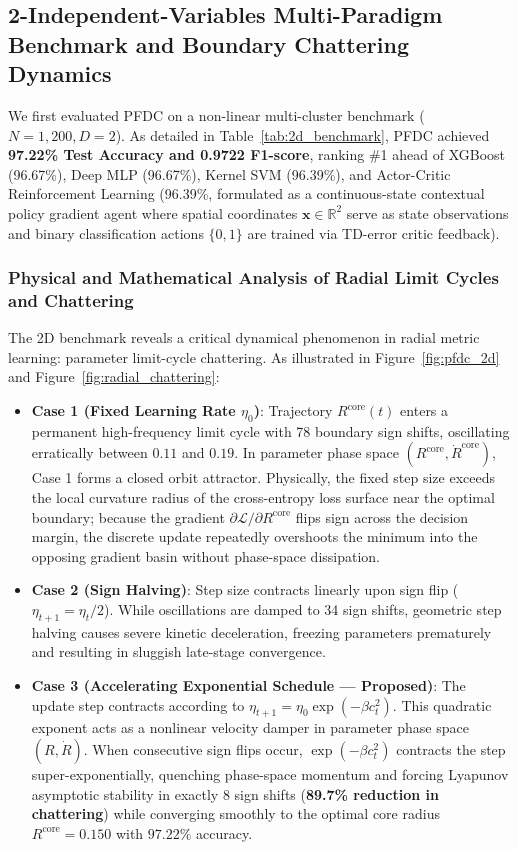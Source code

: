 \documentclass[preprint,review,12pt]{elsarticle}
\begin{document}
\subsection{2-Independent-Variables Multi-Paradigm Benchmark and Boundary Chattering Dynamics}
\label{sec:2d_benchmark}
We first evaluated PFDC on a non-linear multi-cluster benchmark ($N=1,200, D=2$). As detailed in Table~\ref{tab:2d_benchmark}, PFDC achieved \textbf{97.22\% Test Accuracy and 0.9722 F1-score}, ranking \#1 ahead of XGBoost (96.67\%), Deep MLP (96.67\%), Kernel SVM (96.39\%), and Actor-Critic Reinforcement Learning (96.39\%, formulated as a continuous-state contextual policy gradient agent where spatial coordinates $\mathbf{x} \in \mathbb{R}^2$ serve as state observations and binary classification actions $\{0, 1\}$ are trained via TD-error critic feedback).

\subsubsection{Physical and Mathematical Analysis of Radial Limit Cycles and Chattering}
The 2D benchmark reveals a critical dynamical phenomenon in radial metric learning: parameter limit-cycle chattering. As illustrated in Figure~\ref{fig:pfdc_2d} and Figure~\ref{fig:radial_chattering}:
\begin{itemize}
    \item \textbf{Case 1 (Fixed Learning Rate $\eta_0$)}: Trajectory $R^{\mathrm{core}}(t)$ enters a permanent high-frequency limit cycle with 78 boundary sign shifts, oscillating erratically between $0.11$ and $0.19$. In parameter phase space $(R^{\mathrm{core}}, \dot{R}^{\mathrm{core}})$, Case 1 forms a closed orbit attractor. Physically, the fixed step size exceeds the local curvature radius of the cross-entropy loss surface near the optimal boundary; because the gradient $\partial \mathcal{L}/\partial R^{\mathrm{core}}$ flips sign across the decision margin, the discrete update repeatedly overshoots the minimum into the opposing gradient basin without phase-space dissipation.
    \item \textbf{Case 2 (Sign Halving)}: Step size contracts linearly upon sign flip ($\eta_{t+1} = \eta_t / 2$). While oscillations are damped to 34 sign shifts, geometric step halving causes severe kinetic deceleration, freezing parameters prematurely and resulting in sluggish late-stage convergence.
    \item \textbf{Case 3 (Accelerating Exponential Schedule --- Proposed)}: The update step contracts according to $\eta_{t+1} = \eta_0 \exp(-\beta c_t^2)$. This quadratic exponent acts as a nonlinear velocity damper in parameter phase space $(R, \dot{R})$. When consecutive sign flips occur, $\exp(-\beta c_t^2)$ contracts the step super-exponentially, quenching phase-space momentum and forcing Lyapunov asymptotic stability in exactly 8 sign shifts (\textbf{89.7\% reduction in chattering}) while converging smoothly to the optimal core radius $R^{\mathrm{core}} = 0.150$ with $97.22\%$ accuracy.
\end{itemize}
\end{document}
